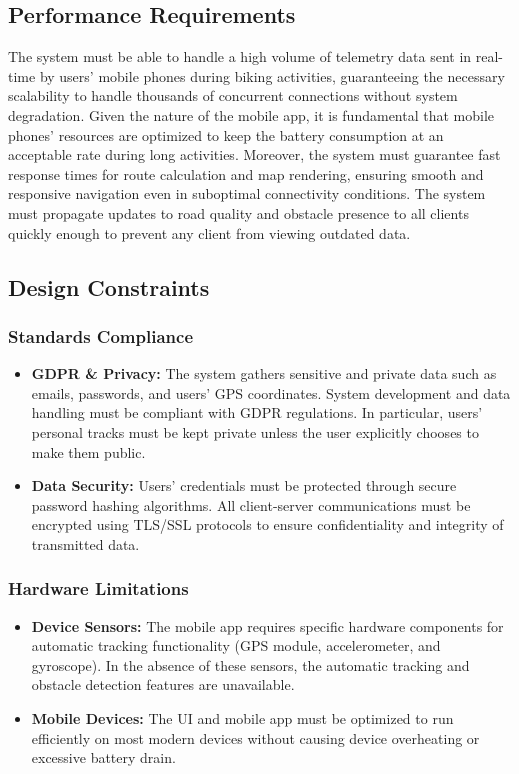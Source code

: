 \subsection{Performance Requirements}

The system must be able to handle a high volume of telemetry data sent in real-time by users' mobile phones during biking activities, guaranteeing the necessary scalability to handle thousands of concurrent connections without system degradation.
Given the nature of the mobile app, it is fundamental that mobile phones' resources are optimized to keep the battery consumption at an acceptable rate during long activities.
Moreover, the system must guarantee fast response times for route calculation and map rendering, ensuring smooth and responsive navigation even in suboptimal connectivity conditions. The system must propagate updates to road quality and obstacle presence to all clients quickly enough to prevent any client from viewing outdated data.

\subsection{Design Constraints}

\subsubsection{Standards Compliance}
\begin{itemize}
    \item[] \textbf{GDPR \& Privacy:} The system gathers sensitive and private data such as emails, passwords, and users' GPS coordinates. System development and data handling must be compliant with GDPR regulations. In particular, users' personal tracks must be kept private unless the user explicitly chooses to make them public.
    
    \item[] \textbf{Data Security:} Users' credentials must be protected through secure password hashing algorithms. All client-server communications must be encrypted using TLS/SSL protocols to ensure confidentiality and integrity of transmitted data.
\end{itemize}

\subsubsection{Hardware Limitations}
\begin{itemize}
    \item[] \textbf{Device Sensors:} The mobile app requires specific hardware components for automatic tracking functionality (GPS module, accelerometer, and gyroscope). In the absence of these sensors, the automatic tracking and obstacle detection features are unavailable.
    
    \item[] \textbf{Mobile Devices:} The UI and mobile app must be optimized to run efficiently on most modern devices without causing device overheating or excessive battery drain.
\end{itemize}

